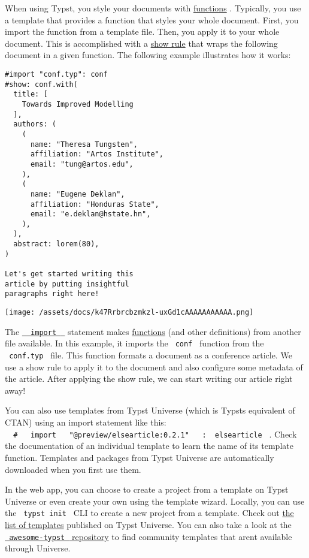 When using Typst, you style your documents with
\href{/docs/reference/foundations/function/}{functions} . Typically, you
use a template that provides a function that styles your whole document.
First, you import the function from a template file. Then, you apply it
to your whole document. This is accomplished with a
\href{/docs/reference/styling/\#show-rules}{show rule} that wraps the
following document in a given function. The following example
illustrates how it works:

\begin{verbatim}
#import "conf.typ": conf
#show: conf.with(
  title: [
    Towards Improved Modelling
  ],
  authors: (
    (
      name: "Theresa Tungsten",
      affiliation: "Artos Institute",
      email: "tung@artos.edu",
    ),
    (
      name: "Eugene Deklan",
      affiliation: "Honduras State",
      email: "e.deklan@hstate.hn",
    ),
  ),
  abstract: lorem(80),
)

Let's get started writing this
article by putting insightful
paragraphs right here!
\end{verbatim}

\texttt{[image: /assets/docs/k47Rrbrcbzmkzl-uxGd1cAAAAAAAAAAA.png]}

The
\href{/docs/reference/scripting/\#modules}{\texttt{\ }{\texttt{\ import\ }}\texttt{\ }}
statement makes \href{/docs/reference/foundations/function/}{functions}
(and other definitions) from another file available. In this example, it
imports the \texttt{\ conf\ } function from the \texttt{\ conf.typ\ }
file. This function formats a document as a conference article. We use a
show rule to apply it to the document and also configure some metadata
of the article. After applying the show rule, we can start writing our
article right away!

You can also use templates from Typst Universe (which is
Typst\textquotesingle s equivalent of CTAN) using an import statement
like this:
\texttt{\ }{\texttt{\ \#\ }}\texttt{\ }{\texttt{\ import\ }}\texttt{\ }{\texttt{\ "@preview/elsearticle:0.2.1"\ }}\texttt{\ }{\texttt{\ :\ }}\texttt{\ elsearticle\ }
. Check the documentation of an individual template to learn the name of
its template function. Templates and packages from Typst Universe are
automatically downloaded when you first use them.

In the web app, you can choose to create a project from a template on
Typst Universe or even create your own using the template wizard.
Locally, you can use the \texttt{\ typst\ init\ } CLI to create a new
project from a template. Check out
\href{https://typst.app/universe/search/?kind=templates}{the list of
templates} published on Typst Universe. You can also take a look at the
\href{https://github.com/qjcg/awesome-typst}{\texttt{\ awesome-typst\ }
repository} to find community templates that aren\textquotesingle t
available through Universe.


